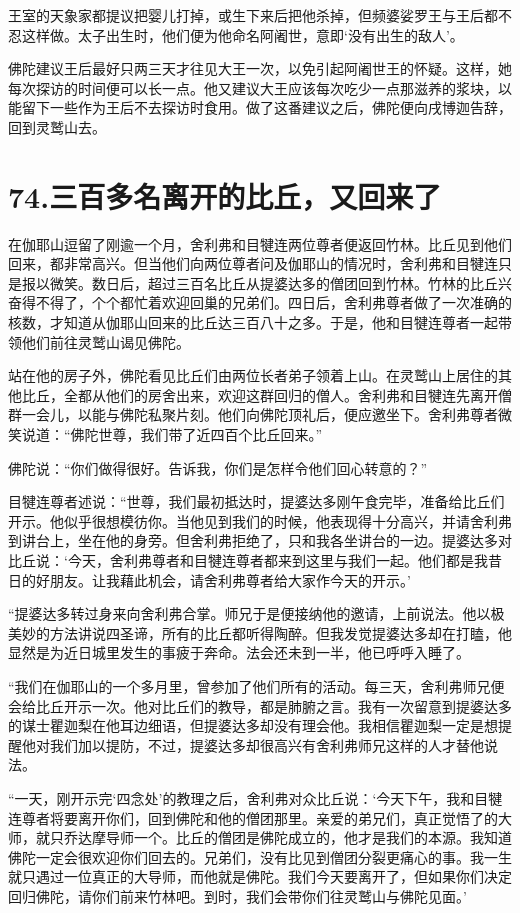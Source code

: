 \documentclass[12pt,twoside,openany]{book}
\begin{document}
王室的天象家都提议把婴儿打掉，或生下来后把他杀掉，但频婆娑罗王与王后都不忍这样做。太子出生时，他们便为他命名阿阇世，意即‘没有出生的敌人’。

佛陀建议王后最好只两三天才往见大王一次，以免引起阿阇世王的怀疑。这样，她每次探访的时间便可以长一点。他又建议大王应该每次吃少一点那滋养的浆块，以能留下一些作为王后不去探访时食用。做了这番建议之后，佛陀便向戌博迦告辞，回到灵鹫山去。


\chapter{74.三百多名离开的比丘，又回来了}\label{ch74}

在伽耶山逗留了刚逾一个月，舍利弗和目犍连两位尊者便返回竹林。比丘见到他们回来，都非常高兴。但当他们向两位尊者问及伽耶山的情况时，舍利弗和目犍连只是报以微笑。数日后，超过三百名比丘从提婆达多的僧团回到竹林。竹林的比丘兴奋得不得了，个个都忙着欢迎回巢的兄弟们。四日后，舍利弗尊者做了一次准确的核数，才知道从伽耶山回来的比丘达三百八十之多。于是，他和目犍连尊者一起带领他们前往灵鹫山谒见佛陀。

站在他的房子外，佛陀看见比丘们由两位长者弟子领着上山。在灵鹫山上居住的其他比丘，全都从他们的房舍出来，欢迎这群回归的僧人。舍利弗和目犍连先离开僧群一会儿，以能与佛陀私聚片刻。他们向佛陀顶礼后，便应邀坐下。舍利弗尊者微笑说道：“佛陀世尊，我们带了近四百个比丘回来。”

佛陀说：“你们做得很好。告诉我，你们是怎样令他们回心转意的？”

目犍连尊者述说：“世尊，我们最初抵达时，提婆达多刚午食完毕，准备给比丘们开示。他似乎很想模彷你。当他见到我们的时候，他表现得十分高兴，并请舍利弗到讲台上，坐在他的身旁。但舍利弗拒绝了，只和我各坐讲台的一边。提婆达多对比丘说：‘今天，舍利弗尊者和目犍连尊者都来到这里与我们一起。他们都是我昔日的好朋友。让我藉此机会，请舍利弗尊者给大家作今天的开示。’

“提婆达多转过身来向舍利弗合掌。师兄于是便接纳他的邀请，上前说法。他以极美妙的方法讲说四圣谛，所有的比丘都听得陶醉。但我发觉提婆达多却在打瞌，他显然是为近日城里发生的事疲于奔命。法会还未到一半，他已呼呼入睡了。

“我们在伽耶山的一个多月里，曾参加了他们所有的活动。每三天，舍利弗师兄便会给比丘开示一次。他对比丘们的教导，都是肺腑之言。我有一次留意到提婆达多的谋士瞿迦梨在他耳边细语，但提婆达多却没有理会他。我相信瞿迦梨一定是想提醒他对我们加以提防，不过，提婆达多却很高兴有舍利弗师兄这样的人才替他说法。

“一天，刚开示完‘四念处’的教理之后，舍利弗对众比丘说：‘今天下午，我和目犍连尊者将要离开你们，回到佛陀和他的僧团那里。亲爱的弟兄们，真正觉悟了的大师，就只乔达摩导师一个。比丘的僧团是佛陀成立的，他才是我们的本源。我知道佛陀一定会很欢迎你们回去的。兄弟们，没有比见到僧团分裂更痛心的事。我一生就只遇过一位真正的大导师，而他就是佛陀。我们今天要离开了，但如果你们决定回归佛陀，请你们前来竹林吧。到时，我们会带你们往灵鹫山与佛陀见面。’
\end{document}
